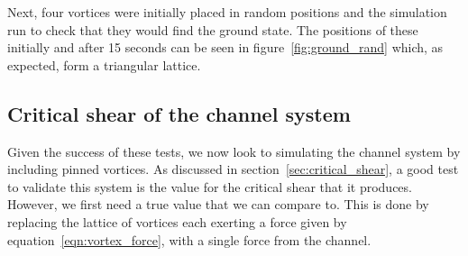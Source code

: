 \documentclass{article}
\numberwithin{equation}{section}
\begin{document}
Next, four vortices were initially placed in random positions and the simulation run to check that they would find the ground state. The positions of these initially and after 15 seconds can be seen in figure~\ref{fig:ground_rand} which, as expected, form a triangular lattice.

\subsection{Critical shear of the channel system} \label{sec:comp_crit_chear}
Given the success of these tests, we now look to simulating the channel system by including pinned vortices. As discussed in section~\ref{sec:critical_shear}, a good test to validate this system is the value for the critical shear that it produces. However, we first need a true value that we can compare to. This is done by replacing the lattice of vortices each exerting a force given by equation~\ref{eqn:vortex_force}, with a single force from the channel.
\end{document}
